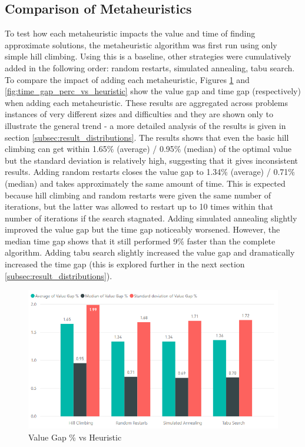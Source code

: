 \FloatBarrier

\subsection{Comparison of Metaheuristics}

To test how each metaheuristic impacts the value and time of finding approximate solutions, the metaheuristic algorithm was first run using only simple hill climbing. Using this is a baseline, other strategies were cumulatively added in the following order: random restarts, simulated annealing, tabu search. To compare the impact of adding each metaheuristic, Figures \ref{fig:value_gap_perc_vs_heuristic} and \ref{fig:time_gap_perc_vs_heuristic} show the value gap and time gap (respectively) when adding each metaheuristic. These results are aggregated across problems instances of very different sizes and difficulties and they are shown only to illustrate the general trend - a more detailed analysis of the results is given in section \ref{subsec:result_distributions}. The results shows that even the basic hill climbing can get within 1.65\% (average) / 0.95\% (median) of the optimal value but the standard deviation is relatively high, suggesting that it gives inconsistent results. Adding random restarts closes the value gap to 1.34\% (average) / 0.71\% (median) and takes approximately the same amount of time. This is expected because hill climbing and random restarts were given the same number of iterations, but the latter was allowed to restart up to 10 times within that number of iterations if the search stagnated. Adding simulated annealing slightly improved the value gap but the time gap noticeably worsened. However, the median time gap shows that it still performed 9\% faster than the complete algorithm. Adding tabu search slightly increased the value gap and dramatically increased the time gap (this is explored further in the next section \ref{subsec:result_distributions}).

\begin{figure}[h!]
    \centering
    \includegraphics[width=\textwidth]{Figures/Metaheuristics/value_gap_perc_vs_heuristic.png}
    \caption{Value Gap \% vs Heuristic}
    \label{fig:value_gap_perc_vs_heuristic}
\end{figure}

